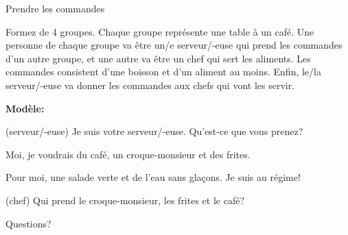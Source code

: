 \documentclass{beamer}
\begin{document}
  \begin{frame}{Prendre les commandes}

    {\small Formez de 4 groupes.
    Chaque groupe représente une table à un café.
    Une personne de chaque groupe va être un/e serveur/-euse qui prend les commandes d'un autre groupe, et une autre va être un chef qui sert les aliments.
    Les commandes consistent d'une \alert{boisson} et d'un \alert{aliment} au moins.
    Enfin, le/la serveur/-euse va donner les commandes aux chefs qui vont les servir.} \\
    
    \begin{description}
      \small
      \item[] \textbf{Modèle:}
      \item[E1:] (serveur/-euse) Je suis votre serveur/-euse. Qu'est-ce que vous prenez?
      \item[E2:] Moi, je voudrais du café, un croque-monsieur et des frites.
      \item[E3:] Pour moi, une salade verte et de l'eau sans glaçons. Je suis au régime!
      \item[E4:] (chef) Qui prend le croque-monsieur, les frites et le café?
    \end{description}
  \end{frame}

  \begin{frame}{}
    \begin{center}
      \Large Questions?
    \end{center}
  \end{frame}
\end{document}
